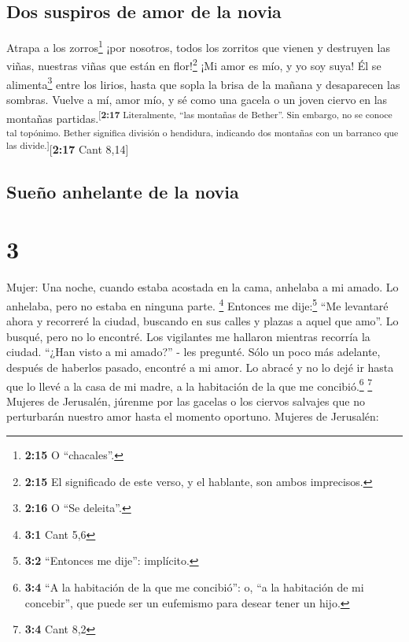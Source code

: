 \hypertarget{dos-suspiros-de-amor-de-la-novia}{%
\subsection{Dos suspiros de amor de la
novia}\label{dos-suspiros-de-amor-de-la-novia}}

 Atrapa a los zorros\footnote{\textbf{2:15} O
  ``chacales''.} ¡por nosotros, todos los zorritos que vienen y
destruyen las viñas, nuestras viñas que están en flor!\footnote{\textbf{2:15}
  El significado de este verso, y el hablante, son ambos imprecisos.}
 ¡Mi amor es mío, y yo soy suya! Él se
alimenta\footnote{\textbf{2:16} O ``Se deleita''.} entre los lirios,
 hasta que sopla la brisa de la mañana y desaparecen las
sombras. Vuelve a mí, amor mío, y sé como una gacela o un joven ciervo
en las montañas partidas.\textsuperscript{{[}\textbf{2:17} Literalmente,
``las montañas de Bether''. Sin embargo, no se conoce tal topónimo.
Bether significa división o hendidura, indicando dos montañas con un
barranco que las divide.{]}}{[}\textbf{2:17} Cant 8,14{]}

\hypertarget{sueuxf1o-anhelante-de-la-novia}{%
\subsection{Sueño anhelante de la
novia}\label{sueuxf1o-anhelante-de-la-novia}}

\hypertarget{section-2}{%
\section{3}\label{section-2}}

Mujer:  Una noche, cuando estaba acostada en la cama,
anhelaba a mi amado. Lo anhelaba, pero no estaba en ninguna parte.
\footnote{\textbf{3:1} Cant 5,6}  Entonces me
dije:\footnote{\textbf{3:2} ``Entonces me dije'': implícito.} ``Me
levantaré ahora y recorreré la ciudad, buscando en sus calles y plazas a
aquel que amo''. Lo busqué, pero no lo encontré.  Los
vigilantes me hallaron mientras recorría la ciudad. ``¿Han visto a mi
amado?'' - les pregunté.  Sólo un poco más adelante,
después de haberlos pasado, encontré a mi amor. Lo abracé y no lo dejé
ir hasta que lo llevé a la casa de mi madre, a la habitación de la que
me concibió.\footnote{\textbf{3:4} ``A la habitación de la que me
  concibió'': o, ``a la habitación de mi concebir'', que puede ser un
  eufemismo para desear tener un hijo.} \footnote{\textbf{3:4} Cant 8,2}
 Mujeres de Jerusalén, júrenme por las gacelas o los
ciervos salvajes que no perturbarán nuestro amor hasta el momento
oportuno. Mujeres de Jerusalén:

